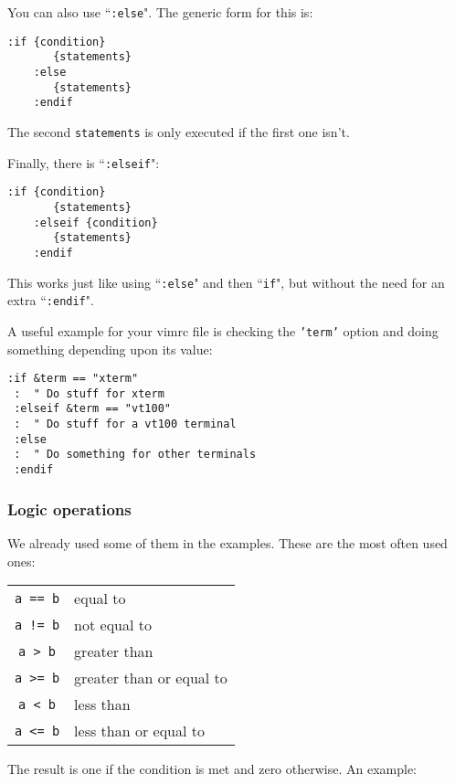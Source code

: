 You can also use ``\texttt{:else}".
The generic form for this is:

\begin{Verbatim}[samepage=true]
    :if {condition}
       {statements}
    :else
       {statements}
    :endif
\end{Verbatim}

The second \texttt{{statements}} is only executed if the first one isn't.

Finally, there is ``\texttt{:elseif}":

\begin{Verbatim}[samepage=true]
    :if {condition}
       {statements}
    :elseif {condition}
       {statements}
    :endif
\end{Verbatim}

This works just like using ``\texttt{:else}" and then ``\texttt{if}", but without the need for an extra ``\texttt{:endif}".

A useful example for your vimrc file is checking the \texttt{'term'} option and doing something depending upon its value:

\begin{Verbatim}[samepage=true]
 :if &term == "xterm"
 :  " Do stuff for xterm
 :elseif &term == "vt100"
 :  " Do stuff for a vt100 terminal
 :else
 :  " Do something for other terminals
 :endif
\end{Verbatim}

\subsubsection{Logic operations}
We already used some of them in the examples.
These are the most often used ones:

\begin{center} \begin{tabular}{c l}
				\texttt{a == b} & equal to \\
				\texttt{a != b} & not equal to \\
				\texttt{a >  b} & greater than \\
				\texttt{a >= b} & greater than or equal to \\
				\texttt{a <  b} & less than \\
				\texttt{a <= b} & less than or equal to \\
\end{tabular} \end{center}

The result is one if the condition is met and zero otherwise.  An example:

